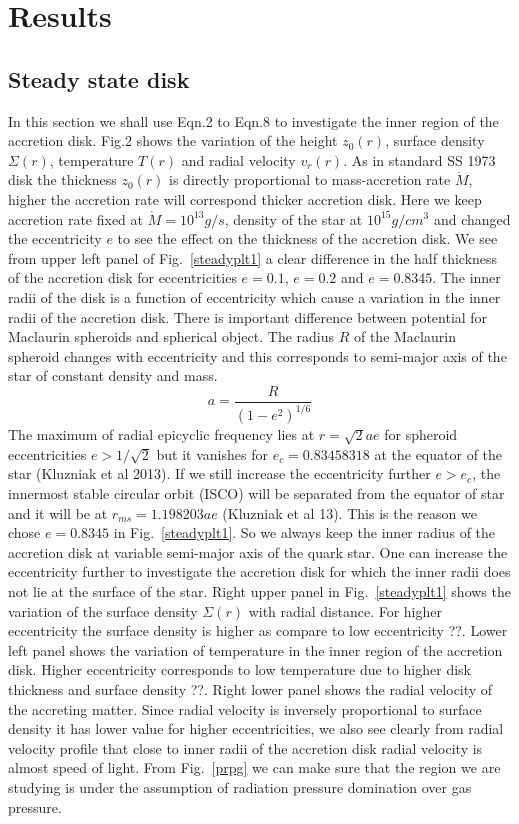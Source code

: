 \documentclass[useAMS,usenatbib]{mn2e}
\begin{document}
\section{Results}
\subsection{Steady state disk}
In this section we shall use Eqn.2 to Eqn.8 to investigate the inner region of the accretion disk. Fig.2 shows the variation of the height $z_0(r)$, surface density $\Sigma(r)$, temperature $T(r)$ and radial velocity $v_r(r)$. As in standard SS 1973 disk the thickness $z_0(r)$ is directly proportional to mass-accretion rate $\dot{M}$, higher the accretion rate will correspond thicker accretion disk. Here we keep accretion rate fixed at $\dot{M} = 10^{13} g/s$, density of the star at $10^15 g/cm^3$ and changed the eccentricity $e$ to see the effect on the thickness of the accretion disk. We see from upper left panel of Fig.~\ref{steadyplt1} a clear difference in the half thickness of the accretion disk for eccentricities $e =0.1$, $e = 0.2$ and $e = 0.8345$. The inner radii of the disk is a function of eccentricity which cause a variation in the inner radii of the accretion disk. There is important difference between potential for Maclaurin spheroids and spherical object. The radius $R$ of the Maclaurin spheroid changes with eccentricity and this corresponds to semi-major axis of the star of constant density and mass. 
\begin{equation}
a = \frac{R}{(1 - e^2)^{1/6}}
\end{equation}
The maximum of radial epicyclic frequency lies at $r = \sqrt{2}ae$ for spheroid eccentricities $e>1/\sqrt{2}$ but it vanishes for $e_c = 0.83458318$ at the equator of the star (Kluzniak et al 2013). If we still increase the eccentricity further $e>e_c$, the innermost stable circular orbit (ISCO) will be separated from the equator of star and it will be at $r_{ms} = 1.198203ae$ (Kluzniak et al 13). This is the reason we chose $e = 0.8345$ in Fig.~\ref{steadyplt1}. So we always keep the inner radius of the accretion disk at variable semi-major axis of the quark star. One can increase the eccentricity further to investigate the accretion disk for which the inner radii does not lie at the surface of the star. Right upper panel in Fig.~\ref{steadyplt1} shows the variation of the surface density $\Sigma(r)$ with radial distance. For higher eccentricity the surface density is higher as compare to low eccentricity ??. Lower left panel shows the variation of temperature in the inner region of the accretion disk. Higher eccentricity corresponds to low temperature due to higher disk thickness and surface density ??. Right lower panel shows the radial velocity of the accreting matter. Since radial velocity is inversely proportional to surface density it has lower value for higher eccentricities, we also see clearly from radial velocity profile that close to inner radii of the accretion disk radial velocity is almost speed of light. From Fig.~\ref{prpg} we can make sure that the region we are studying is under the assumption of radiation pressure domination over gas pressure.
\end{document}
